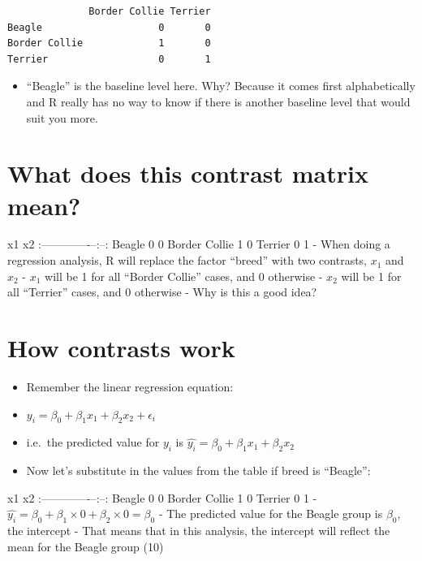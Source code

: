 \documentclass[]{article}
\begin{document}
\begin{verbatim}
              Border Collie Terrier
Beagle                    0       0
Border Collie             1       0
Terrier                   0       1
\end{verbatim}

\begin{itemize}
\itemsep1pt\parskip0pt
\item
  ``Beagle'' is the baseline level here. Why? Because it comes first
  alphabetically and R really has no way to know if there is another
  baseline level that would suit you more.
\end{itemize}

\section{What does this contrast matrix
mean?}\label{what-does-this-contrast-matrix-mean}

\textbar{} \textbar{} x1\textbar{} x2\textbar{}
\textbar{}:-------------\textbar{}--:\textbar{}--:\textbar{}
\textbar{}Beagle \textbar{} 0\textbar{} 0\textbar{} \textbar{}Border
Collie \textbar{} 1\textbar{} 0\textbar{} \textbar{}Terrier \textbar{}
0\textbar{} 1\textbar{} - When doing a regression analysis, R will
replace the factor ``breed'' with two contrasts, $x_1$ and $x_2$ - $x_1$
will be 1 for all ``Border Collie'' cases, and 0 otherwise - $x_2$ will
be 1 for all ``Terrier'' cases, and 0 otherwise - Why is this a good
idea?

\section{How contrasts work}\label{how-contrasts-work}

\begin{itemize}
\itemsep1pt\parskip0pt
\item
  Remember the linear regression equation:
\item
  $y_{i} = \beta_0 + \beta_1 x_{1} + \beta_2 x_{2} + \epsilon_i$
\item
  i.e.~the predicted value for $y_i$ is
  $\hat{y_i} = \beta_0 + \beta_1 x_{1} + \beta_2 x_{2}$
\item
  Now let's substitute in the values from the table if breed is
  ``Beagle'':
\end{itemize}

\textbar{} \textbar{} x1\textbar{} x2\textbar{}
\textbar{}:-------------\textbar{}--:\textbar{}--:\textbar{}
\textbar{}Beagle \textbar{} 0\textbar{} 0\textbar{} \textbar{}Border
Collie \textbar{} 1\textbar{} 0\textbar{} \textbar{}Terrier \textbar{}
0\textbar{} 1\textbar{} -
$\hat{y_{i}} = \beta_0 + \beta_1 \times 0 + \beta_2 \times 0 = \beta_0$
- The predicted value for the Beagle group is $\beta_0$, the intercept -
That means that in this analysis, the intercept will reflect the mean
for the Beagle group (10)
\end{document}
